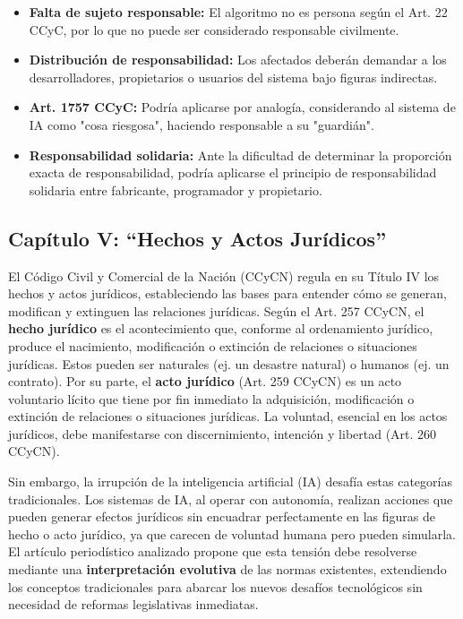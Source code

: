 \documentclass[10pt, a4paper]{article}
\begin{document}
\begin{itemize}
    \item \textbf{Falta de sujeto responsable:} El algoritmo no es persona según el Art. 22 CCyC, por lo que no puede ser considerado responsable civilmente.
    \item \textbf{Distribución de responsabilidad:} Los afectados deberán demandar a los desarrolladores, propietarios o usuarios del sistema bajo figuras indirectas.
    \item \textbf{Art. 1757 CCyC:} Podría aplicarse por analogía, considerando al sistema de IA como "cosa riesgosa", haciendo responsable a su "guardián".
    \item \textbf{Responsabilidad solidaria:} Ante la dificultad de determinar la proporción exacta de responsabilidad, podría aplicarse el principio de responsabilidad solidaria entre fabricante, programador y propietario.
\end{itemize}

\subsection{Capítulo V: ``Hechos y Actos Jurídicos''}
\label{subsec:hechos_actos}

El Código Civil y Comercial de la Nación (CCyCN) regula en su Título IV los hechos y actos jurídicos, estableciendo las bases para entender cómo se generan, modifican y extinguen las relaciones jurídicas. Según el Art. 257 CCyCN, el \textbf{hecho jurídico} es el acontecimiento que, conforme al ordenamiento jurídico, produce el nacimiento, modificación o extinción de relaciones o situaciones jurídicas. Estos pueden ser naturales (ej. un desastre natural) o humanos (ej. un contrato). Por su parte, el \textbf{acto jurídico} (Art. 259 CCyCN) es un acto voluntario lícito que tiene por fin inmediato la adquisición, modificación o extinción de relaciones o situaciones jurídicas. La voluntad, esencial en los actos jurídicos, debe manifestarse con discernimiento, intención y libertad (Art. 260 CCyCN).

Sin embargo, la irrupción de la inteligencia artificial (IA) desafía estas categorías tradicionales. Los sistemas de IA, al operar con autonomía, realizan acciones que pueden generar efectos jurídicos sin encuadrar perfectamente en las figuras de hecho o acto jurídico, ya que carecen de voluntad humana pero pueden simularla. El artículo periodístico analizado propone que esta tensión debe resolverse mediante una \textbf{interpretación evolutiva} de las normas existentes, extendiendo los conceptos tradicionales para abarcar los nuevos desafíos tecnológicos sin necesidad de reformas legislativas inmediatas.
\end{document}
